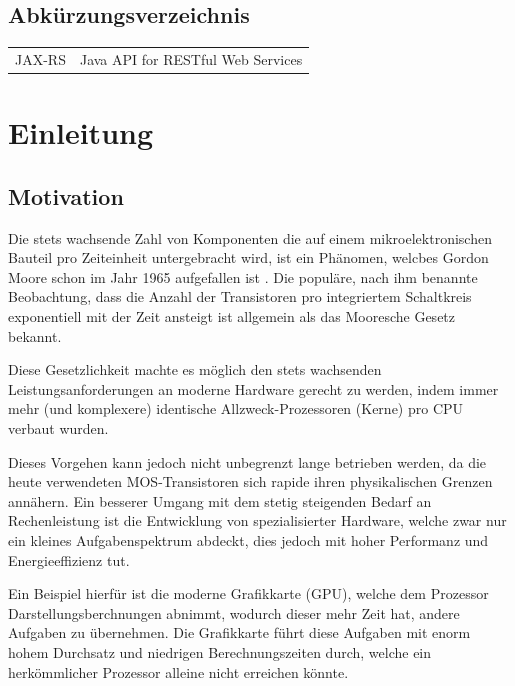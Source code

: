 \documentclass[a4paper,12pt,onesided]{report}
\begin{document}
\newpage
\listoffigures
{}

\newpage
\listoftables
{}

\newpage
\lstlistoflistings
{}

\newpage
\section*{Abkürzungsverzeichnis}
\begin{tabular}{ll}
  JAX-RS&Java API for RESTful Web Services\\
\end{tabular}

\newpage
\chapter{Einleitung}

\section{Motivation}
Die stets wachsende Zahl von Komponenten die auf einem mikroelektronischen Bauteil pro Zeiteinheit untergebracht wird, ist ein Phänomen, welcbes Gordon Moore schon im Jahr 1965 aufgefallen ist \cite{moore1965cramming}. Die populäre, nach ihm benannte Beobachtung, dass die Anzahl der Transistoren pro integriertem Schaltkreis exponentiell mit der Zeit ansteigt ist allgemein als das Mooresche Gesetz bekannt.

Diese Gesetzlichkeit machte es möglich den stets wachsenden Leistungsanforderungen an moderne Hardware gerecht zu werden, indem immer mehr (und komplexere) identische Allzweck-Prozessoren (Kerne) pro CPU verbaut wurden.

Dieses Vorgehen kann jedoch nicht unbegrenzt lange betrieben werden, da die heute verwendeten MOS-Transistoren sich rapide ihren physikalischen Grenzen annähern. Ein besserer Umgang mit dem stetig steigenden Bedarf an Rechenleistung ist die Entwicklung von spezialisierter Hardware, welche zwar nur ein kleines Aufgabenspektrum abdeckt, dies jedoch mit hoher Performanz und Energieeffizienz tut.

Ein Beispiel hierfür ist die moderne Grafikkarte (GPU), welche dem Prozessor Darstellungsberchnungen abnimmt, wodurch dieser mehr Zeit hat, andere Aufgaben zu übernehmen. Die Grafikkarte führt diese Aufgaben mit enorm hohem Durchsatz und niedrigen Berechnungszeiten durch, welche ein herkömmlicher Prozessor alleine nicht erreichen könnte.
\end{document}
